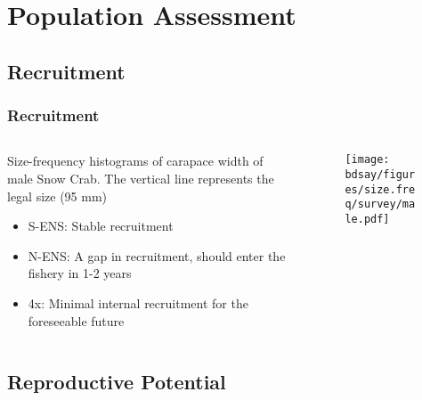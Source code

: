 \documentclass{beamer}
\numberwithin{equation}{section}		%
\numberwithin{figure}{section}		%
\numberwithin{table}{section}				%
\newcommand{\bd}{\string~/bio.data}   %
\newcommand{\bds}{\bd/bio.snowcrab}
\newcommand{\bdsa}{\bds/assessments}
\newcommand{\bdsay}{\bdsa/2016}
\begin{document}
\section{Population Assessment}
\subsection{Recruitment}

\begin{frame}
\frametitle{Recruitment}
\begin{columns}
	\begin{column}{0.5\textwidth}
	Size-frequency histograms of carapace width of male Snow Crab. The vertical line represents the legal size (95 mm)
	\begin{itemize}
		\item S-ENS: Stable recruitment
		\item N-ENS: A gap in recruitment, should enter the fishery in 1-2 years
		\item 4x: Minimal internal recruitment for the foreseeable future  
	\end{itemize}
	\end{column}

	\begin{column}{0.5\textwidth}
	\begin{figure}
		\texttt{[image: \\bdsay/figures/size.freq/survey/male.pdf]}
	\end{figure}
	\end{column}
	\end{columns}
\end{frame}

\subsection{Reproductive Potential}
\end{document}
